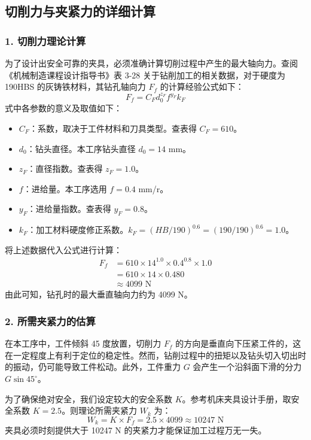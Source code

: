 \documentclass[withoutpreface,bwprint]{cumcmthesis}
\begin{document}
\subsection{切削力与夹紧力的详细计算}

\subsubsection{1. 切削力理论计算}
为了设计出安全可靠的夹具，必须准确计算切削过程中产生的最大轴向力。查阅《机械制造课程设计指导书》表 3-28 关于钻削加工的相关数据，对于硬度为 190HBS 的灰铸铁材料，其钻孔轴向力 $F_f$ 的计算经验公式如下：
\[ F_f = C_F d_0^{z_F} f^{y_F} k_F \]
式中各参数的意义及取值如下：
\begin{itemize}
    \item $C_F$：系数，取决于工件材料和刀具类型。查表得 $C_F = 610$。
    \item $d_0$：钻头直径。本工序钻头直径 $d_0 = 14$ mm。
    \item $z_F$：直径指数。查表得 $z_F = 1.0$。
    \item $f$：进给量。本工序选用 $f = 0.4$ mm/r。
    \item $y_F$：进给量指数。查表得 $y_F = 0.8$。
    \item $k_F$：加工材料硬度修正系数。$k_F = (HB/190)^{0.6} = (190/190)^{0.6} = 1.0$。
\end{itemize}

将上述数据代入公式进行计算：
\[ 
\begin{aligned}
F_f &= 610 \times 14^{1.0} \times 0.4^{0.8} \times 1.0 \\
    &= 610 \times 14 \times 0.480 \\
    &\approx 4099 \text{ N} 
\end{aligned}
\]
由此可知，钻孔时的最大垂直轴向力约为 4099 N。

\subsubsection{2. 所需夹紧力的估算}
在本工序中，工件倾斜 45 度放置，切削力 $F_f$ 的方向是垂直向下压紧工件的，这在一定程度上有利于定位的稳定性。然而，钻削过程中的扭矩以及钻头切入切出时的振动，仍可能导致工件松动。此外，工件重力 $G$ 会产生一个沿斜面下滑的分力 $G \sin 45^\circ$。

为了确保绝对安全，我们设定较大的安全系数 $K$。参考机床夹具设计手册，取安全系数 $K = 2.5$。则理论所需夹紧力 $W_k$ 为：
\[ W_k = K \times F_f = 2.5 \times 4099 \approx 10247 \text{ N} \]
夹具必须时刻提供大于 10247 N 的夹紧力才能保证加工过程万无一失。
\end{document}
